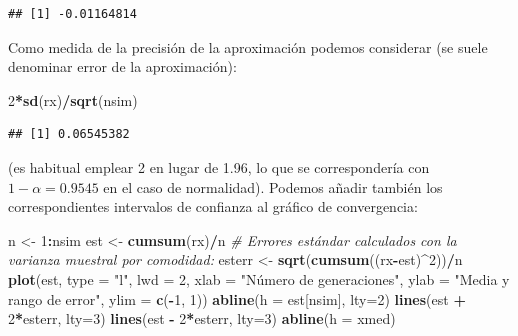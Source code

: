\documentclass[
]{book}
\newenvironment{Shaded}{\begin{snugshade}}{\end{snugshade}}
\newcommand{\CommentTok}[1]{\textcolor[rgb]{0.56,0.35,0.01}{\textit{#1}}}
\newcommand{\DataTypeTok}[1]{\textcolor[rgb]{0.13,0.29,0.53}{#1}}
\newcommand{\DecValTok}[1]{\textcolor[rgb]{0.00,0.00,0.81}{#1}}
\newcommand{\KeywordTok}[1]{\textcolor[rgb]{0.13,0.29,0.53}{\textbf{#1}}}
\newcommand{\NormalTok}[1]{#1}
\newcommand{\OperatorTok}[1]{\textcolor[rgb]{0.81,0.36,0.00}{\textbf{#1}}}
\newcommand{\StringTok}[1]{\textcolor[rgb]{0.31,0.60,0.02}{#1}}
\theoremstyle{break}
\theoremstyle{definition}
\theoremstyle{definition}
\theoremstyle{definition}
\theoremstyle{remark}
\begin{document}
\begin{verbatim}
## [1] -0.01164814
\end{verbatim}

Como medida de la precisión de la aproximación podemos considerar (se suele denominar error de la aproximación):

\begin{Shaded}
\begin{Highlighting}[]
\DecValTok{2}\OperatorTok{*}\KeywordTok{sd}\NormalTok{(rx)}\OperatorTok{/}\KeywordTok{sqrt}\NormalTok{(nsim)}
\end{Highlighting}
\end{Shaded}

\begin{verbatim}
## [1] 0.06545382
\end{verbatim}

(es habitual emplear 2 en lugar de 1.96,
lo que se correspondería con \(1 - \alpha = 0.9545\) en el caso de normalidad).
Podemos añadir también los correspondientes intervalos de confianza al gráfico de convergencia:

\begin{Shaded}
\begin{Highlighting}[]
\NormalTok{n <-}\StringTok{ }\DecValTok{1}\OperatorTok{:}\NormalTok{nsim}
\NormalTok{est <-}\StringTok{ }\KeywordTok{cumsum}\NormalTok{(rx)}\OperatorTok{/}\NormalTok{n}
\CommentTok{# Errores estándar calculados con la varianza muestral por comodidad:}
\NormalTok{esterr <-}\StringTok{ }\KeywordTok{sqrt}\NormalTok{(}\KeywordTok{cumsum}\NormalTok{((rx}\OperatorTok{-}\NormalTok{est)}\OperatorTok{^}\DecValTok{2}\NormalTok{))}\OperatorTok{/}\NormalTok{n  }
\KeywordTok{plot}\NormalTok{(est, }\DataTypeTok{type =} \StringTok{"l"}\NormalTok{, }\DataTypeTok{lwd =} \DecValTok{2}\NormalTok{, }\DataTypeTok{xlab =} \StringTok{"Número de generaciones"}\NormalTok{, }
     \DataTypeTok{ylab =} \StringTok{"Media y rango de error"}\NormalTok{, }\DataTypeTok{ylim =} \KeywordTok{c}\NormalTok{(}\OperatorTok{-}\DecValTok{1}\NormalTok{, }\DecValTok{1}\NormalTok{))}
\KeywordTok{abline}\NormalTok{(}\DataTypeTok{h =}\NormalTok{ est[nsim], }\DataTypeTok{lty=}\DecValTok{2}\NormalTok{)}
\KeywordTok{lines}\NormalTok{(est }\OperatorTok{+}\StringTok{ }\DecValTok{2}\OperatorTok{*}\NormalTok{esterr, }\DataTypeTok{lty=}\DecValTok{3}\NormalTok{)}
\KeywordTok{lines}\NormalTok{(est }\OperatorTok{-}\StringTok{ }\DecValTok{2}\OperatorTok{*}\NormalTok{esterr, }\DataTypeTok{lty=}\DecValTok{3}\NormalTok{)}
\KeywordTok{abline}\NormalTok{(}\DataTypeTok{h =}\NormalTok{ xmed)}
\end{Highlighting}
\end{Shaded}
\end{document}
